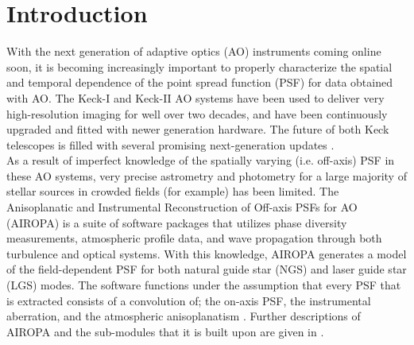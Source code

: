 \documentclass[]{spie}  %
\begin{document}
\section{Introduction} \label{sec:intro}
With the next generation of adaptive optics (AO) instruments coming online soon, it is becoming increasingly important to properly characterize the spatial and temporal dependence of the point spread function (PSF) for data obtained with AO. The Keck-I and Keck-II AO systems have been used to deliver very high-resolution imaging for well over two decades, and have been continuously upgraded and fitted with newer generation hardware. The future of both Keck telescopes is filled with several promising next-generation updates \cite{wizinowich:2020a, bond:2020a}.
\\
\indent As a result of imperfect knowledge of the spatially varying (i.e. off-axis) PSF in these AO systems, very precise astrometry and photometry for a large majority of stellar sources in crowded fields (for example) has been limited. The Anisoplanatic and Instrumental Reconstruction of Off-axis PSFs for AO (AIROPA) is a suite of software packages that utilizes phase diversity measurements, atmospheric profile data, and wave propagation through both turbulence and optical systems. With this knowledge, AIROPA generates a model of the field-dependent PSF for both natural guide star (NGS) and laser guide star (LGS) modes. The software functions under the assumption that every PSF that is extracted consists of a convolution of; the on-axis PSF, the instrumental aberration, and the atmospheric anisoplanatism \cite{do:2018a}. Further descriptions of AIROPA and the sub-modules that it is built upon are given in \cite{witzel:2016a}.
\\
\end{document}
